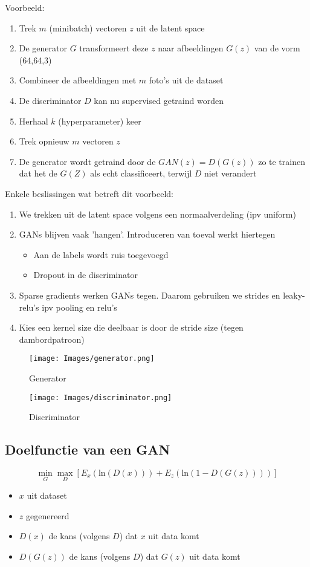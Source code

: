 {\noindent Voorbeeld:
\begin{enumerate}
    \item Trek $m$ (minibatch) vectoren $z$ uit de latent space
    \item De generator $G$ transformeert deze $z$ naar afbeeldingen $G(z)$ van de vorm (64,64,3)
    \item Combineer de afbeeldingen met $m$ foto's uit de dataset
    \item De discriminator $D$ kan nu supervised getraind worden
    \item Herhaal $k$ (hyperparameter) keer
    \item Trek opnieuw $m$ vectoren $z$
    \item De generator wordt getraind door de $GAN(z)=D(G(z))$ zo te trainen dat het de $G(Z)$ als echt classificeert, terwijl $D$ niet verandert
\end{enumerate}
\noindent Enkele beslissingen wat betreft dit voorbeeld:
\begin{enumerate}
    \item We trekken uit de latent space volgens een normaalverdeling (ipv uniform)
    \item GANs blijven vaak 'hangen'. Introduceren van toeval werkt hiertegen
    \begin{itemize}
        \item Aan de labels wordt ruis toegevoegd
        \item Dropout in de discriminator
    \end{itemize}
    \item Sparse gradients werken GANs tegen. Daarom gebruiken we strides en leaky-relu's ipv pooling en relu's
    \item Kies een kernel size die deelbaar is door de stride size (tegen dambordpatroon)
\end{enumerate}

\begin{figure}[h]
    \centering
    \texttt{[image: Images/generator.png]}
    \caption{Generator}
    \label{fig:gen}
\end{figure}
\begin{figure}[h]
    \centering
    \texttt{[image: Images/discriminator.png]}
    \caption{Discriminator}
    \label{fig:dis}
\end{figure}
\subsection{Doelfunctie van een GAN}
\[
\min_{G}\max_{D}[E_x(\textrm{ln}(D(x)))+E_z(\textrm{ln}(1-D(G(z))))]
\]
\begin{itemize}
    \item $x$ uit dataset
    \item $z$ gegenereerd
    \item $D(x)$ de kans (volgens $D$) dat $x$ uit data komt
    \item $D(G(z))$ de kans (volgens $D$) dat $G(z)$ uit data komt
\end{itemize}
}
